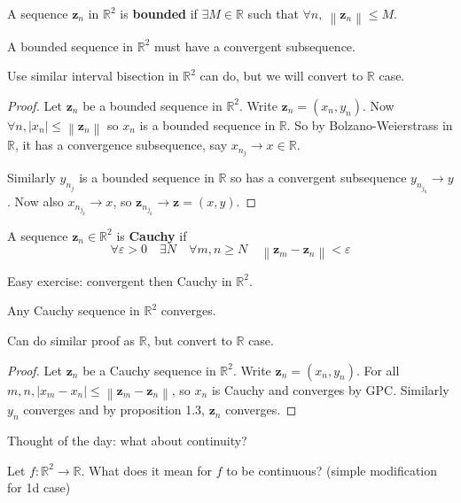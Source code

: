 \documentclass[a4paper]{article}
\renewcommand{\epsilon}{\varepsilon}
\begin{document}
\begin{definition}
    A sequence $\mathbf{z}_n$ in $ \mathbb{R}^{2} $ is \textbf{bounded} if $\exists M\in \mathbb{R}$ such that $ \forall n,\ \left\| \mathbf{z}_n \right\|\le M $. 
\end{definition}

\begin{theorem}
    A bounded sequence in $ \mathbb{R}^{2} $ must have a convergent subsequence.
\end{theorem}
Use similar interval bisection in $ \mathbb{R}^{2} $ can do, but we will convert to $\mathbb{R}$ case. 

\begin{proof}
    Let $ \mathbf{z}_n $ be a bounded sequence in $ \mathbb{R}^{2} $. Write $ \mathbf{z}_n = (x_n,y_n) $. Now $ \forall n, |x_n| \le \left\| \mathbf{z}_n \right\| $ so $x_n$ is a bounded sequence in $ \mathbb{R} $. So by Bolzano-Weierstrass in $ \mathbb{R} $, it has a convergence subsequence, say $ x_{n_j}\to x\in \mathbb{R} $. 

    Similarly $ y_{n_j} $ is a bounded sequence in $ \mathbb{R} $ so has a convergent subsequence $ y_{n_{j_k}}\to y $. Now also $ x_{n_{j_k}} \to x$, so $ \mathbf{z}_{n_{j_k}}\to \mathbf{z}= (x,y) $. 
\end{proof}

\begin{definition}
    A sequence $ \mathbf{z}_n\in \mathbb{R}^{2} $ is \textbf{Cauchy} if 
    \[
        \forall \epsilon>0\quad \exists N\quad \forall m,n\ge N\quad \left\| \mathbf{z}_m-\mathbf{z}_n \right\|<\epsilon
    \]
\end{definition}
Easy exercise: convergent then Cauchy in $ \mathbb{R}^{2} $. 

\begin{theorem}
    Any Cauchy sequence in $ \mathbb{R}^{2} $ converges. 
\end{theorem}
Can do similar proof as $\mathbb{R}$, but convert to $\mathbb{R}$ case. 
\begin{proof}
    Let $ \mathbf{z}_n $ be a Cauchy sequence in $ \mathbb{R}^{2} $. Write $ \mathbf{z}_n = (x_n,y_n) $. For all $ m,n, |x_m-x_n| \le \left\| \mathbf{z}_m-\mathbf{z}_n \right\| $, so $ x_n $ is Cauchy and converges by GPC. Similarly $ y_n $ converges and by proposition 1.3, $ \mathbf{z}_n $ converges.
\end{proof}
Thought of the day: what about continuity? 

Let $ f: \mathbb{R}^{2}\to \mathbb{R} $. What does it mean for $f$ to be continuous? (simple modification for 1d case)
\end{document}
